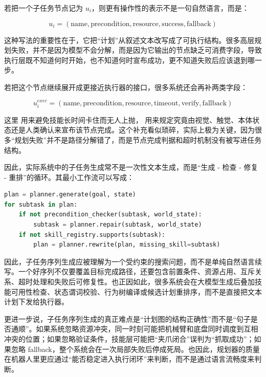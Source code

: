 若把一个子任务节点记为 \(u_i\)，则更有操作性的表示不是一句自然语言，而是：

\begingroup
\footnotesize
\begin{equation*}
u_i = (\text{name}, \text{precondition}, \text{resource}, \text{success}, \text{fallback})
\end{equation*}
\endgroup

这种写法的重要性在于，它把“计划”从叙述文本改写成了可执行结构。很多高层规划失败，并不是因为模型不会分解，而是因为它输出的节点缺乏可消费字段，导致执行层既不知道何时开始，也不知道何时宣布成功，更不知道失败后应该退到哪一步。

若把这个节点继续展开成更接近执行器的接口，很多系统还会再补两类字段：

\begingroup
\scriptsize
\begin{equation*}
u_i^{exec} =
(\text{name}, \text{precondition}, \text{resource}, \text{timeout}, \text{verify}, \text{fallback})
\end{equation*}
\endgroup

这里 \texttt{} 用来避免技能长时间卡住而无人上抛，\texttt{} 用来规定究竟由视觉、触觉、本体状态还是人类确认来宣布该节点完成。这个补充看似琐碎，实际上极为关键，因为很多“规划失败”并不是路径分解错了，而是节点完成判据和超时机制没有被写进任务结构。

因此，实际系统中的子任务生成常不是一次性文本生成，而是“生成 - 检查 - 修复 - 重排”的循环。其最小工作流可以写成：

\begin{lstlisting}[language=python]
plan = planner.generate(goal, state)
for subtask in plan:
    if not precondition_checker(subtask, world_state):
        subtask = planner.repair(subtask, world_state)
    if not skill_registry.supports(subtask):
        plan = planner.rewrite(plan, missing_skill=subtask)
\end{lstlisting}

因此，子任务序列生成应被理解为一个受约束的搜索问题，而不是单纯自然语言续写。一个好序列不仅要覆盖目标完成路径，还要包含前置条件、资源占用、互斥关系、超时处理和失败后可修复性。也正因如此，很多系统会在大模型生成后叠加技能可用性检查、状态谓词校验、行为树编译或候选计划重排序，而不是直接把文本计划下发给执行器。

更进一步说，子任务序列生成的真正难点是“计划图的结构正确性”而不是“句子是否通顺”。如果系统忽略资源冲突，同一时刻可能把机械臂和底盘同时调度到互相冲突的位置；如果忽略验证条件，技能层可能把“夹爪闭合”误判为“抓取成功”；如果忽略 fallback，整个系统会在一次局部失败后停成死局。也因此，规划器的质量在机器人里更应通过“能否稳定进入执行闭环”来判断，而不是通过语言流畅度来判断。

